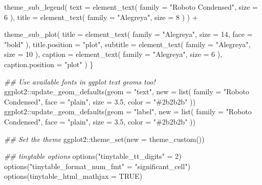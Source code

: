 \documentclass[
  letterpaper,
  DIV=11,
  numbers=noendperiod,
  oneside]{scrartcl}
\newenvironment{Shaded}{\begin{snugshade}}{\end{snugshade}}
\newcommand{\AttributeTok}[1]{\textcolor[rgb]{0.40,0.45,0.13}{#1}}
\newcommand{\ConstantTok}[1]{\textcolor[rgb]{0.56,0.35,0.01}{#1}}
\newcommand{\DecValTok}[1]{\textcolor[rgb]{0.68,0.00,0.00}{#1}}
\newcommand{\DocumentationTok}[1]{\textcolor[rgb]{0.37,0.37,0.37}{\textit{#1}}}
\newcommand{\FloatTok}[1]{\textcolor[rgb]{0.68,0.00,0.00}{#1}}
\newcommand{\FunctionTok}[1]{\textcolor[rgb]{0.28,0.35,0.67}{#1}}
\newcommand{\NormalTok}[1]{\textcolor[rgb]{0.00,0.23,0.31}{#1}}
\newcommand{\OtherTok}[1]{\textcolor[rgb]{0.00,0.23,0.31}{#1}}
\newcommand{\SpecialCharTok}[1]{\textcolor[rgb]{0.37,0.37,0.37}{#1}}
\newcommand{\StringTok}[1]{\textcolor[rgb]{0.13,0.47,0.30}{#1}}
\begin{document}
\begin{Shaded}
\begin{Highlighting}[]
    \FunctionTok{theme\_sub\_legend}\NormalTok{(}
      \AttributeTok{text =} \FunctionTok{element\_text}\NormalTok{(}
        \AttributeTok{family =} \StringTok{"Roboto Condensed"}\NormalTok{,}
        \AttributeTok{size =} \DecValTok{6}
\NormalTok{      ),}
      \AttributeTok{title =} \FunctionTok{element\_text}\NormalTok{(}
        \AttributeTok{family =} \StringTok{"Alegreya"}\NormalTok{,}
        \AttributeTok{size =} \DecValTok{8}
\NormalTok{      )}
\NormalTok{    ) }\SpecialCharTok{+}

    \FunctionTok{theme\_sub\_plot}\NormalTok{(}
      \AttributeTok{title =} \FunctionTok{element\_text}\NormalTok{(}
        \AttributeTok{family =} \StringTok{"Alegreya"}\NormalTok{,}
        \AttributeTok{size =} \DecValTok{14}\NormalTok{, }\AttributeTok{face =} \StringTok{"bold"}
\NormalTok{      ),}
      \AttributeTok{title.position =} \StringTok{"plot"}\NormalTok{,}
      \AttributeTok{subtitle =} \FunctionTok{element\_text}\NormalTok{(}
        \AttributeTok{family =} \StringTok{"Alegreya"}\NormalTok{,}
        \AttributeTok{size =} \DecValTok{10}
\NormalTok{      ),}
      \AttributeTok{caption =} \FunctionTok{element\_text}\NormalTok{(}
        \AttributeTok{family =} \StringTok{"Alegreya"}\NormalTok{,}
        \AttributeTok{size =} \DecValTok{6}
\NormalTok{      ),}
      \AttributeTok{caption.position =} \StringTok{"plot"}
\NormalTok{    )}
\NormalTok{\}}

\DocumentationTok{\#\# Use available fonts in ggplot text geoms too!}
\NormalTok{ggplot2}\SpecialCharTok{::}\FunctionTok{update\_geom\_defaults}\NormalTok{(}\AttributeTok{geom =} \StringTok{"text"}\NormalTok{, }\AttributeTok{new =} \FunctionTok{list}\NormalTok{(}
  \AttributeTok{family =} \StringTok{"Roboto Condensed"}\NormalTok{,}
  \AttributeTok{face =} \StringTok{"plain"}\NormalTok{,}
  \AttributeTok{size =} \FloatTok{3.5}\NormalTok{,}
  \AttributeTok{color =} \StringTok{"\#2b2b2b"}
\NormalTok{))}
\NormalTok{ggplot2}\SpecialCharTok{::}\FunctionTok{update\_geom\_defaults}\NormalTok{(}\AttributeTok{geom =} \StringTok{"label"}\NormalTok{, }\AttributeTok{new =} \FunctionTok{list}\NormalTok{(}
  \AttributeTok{family =} \StringTok{"Roboto Condensed"}\NormalTok{,}
  \AttributeTok{face =} \StringTok{"plain"}\NormalTok{,}
  \AttributeTok{size =} \FloatTok{3.5}\NormalTok{,}
  \AttributeTok{color =} \StringTok{"\#2b2b2b"}
\NormalTok{))}

\DocumentationTok{\#\# Set the theme}
\NormalTok{ggplot2}\SpecialCharTok{::}\FunctionTok{theme\_set}\NormalTok{(}\AttributeTok{new =} \FunctionTok{theme\_custom}\NormalTok{())}

\DocumentationTok{\#\# tinytable options}
\FunctionTok{options}\NormalTok{(}\StringTok{"tinytable\_tt\_digits"} \OtherTok{=} \DecValTok{2}\NormalTok{)}
\FunctionTok{options}\NormalTok{(}\StringTok{"tinytable\_format\_num\_fmt"} \OtherTok{=} \StringTok{"significant\_cell"}\NormalTok{)}
\FunctionTok{options}\NormalTok{(}\AttributeTok{tinytable\_html\_mathjax =} \ConstantTok{TRUE}\NormalTok{)}
\end{Highlighting}
\end{Shaded}
\end{document}
